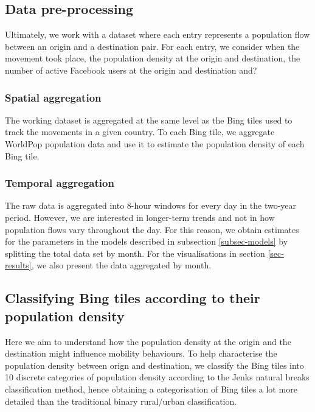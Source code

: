 \documentclass[11pt,letterpaper]{article}
\begin{document}
\subsection{Data pre-processing}

Ultimately, we work with a dataset where each entry represents a
population flow between an origin and a destination pair. For each
entry, we consider when the movement took place, the population density
at the origin and destination, the number of active Facebook users at
the origin and destination and?

\subsubsection{Spatial aggregation}

The working dataset is aggregated at the same level as the Bing tiles
used to track the movements in a given country. To each Bing tile, we
aggregate WorldPop population data and use it to estimate the population
density of each Bing tile.

\subsubsection{Temporal aggregation}

The raw data is aggregated into 8-hour windows for every day in the
two-year period. However, we are interested in longer-term trends and
not in how population flows vary throughout the day. For this reason, we
obtain estimates for the parameters in the models described in
subsection \ref{subsec-models} by splitting the total data set by month.
For the visualisations in section \ref{sec-results}, we also present the
data aggregated by month.

\subsection{Classifying Bing tiles according to their population density}

Here we aim to understand how the population density at the origin and
the destination might influence mobility behaviours. To help
characterise the population density between orign and destination, we
classify the Bing tiles into 10 discrete categories of population
density according to the Jenks natural breaks classification method,
hence obtaining a categorisation of Bing tiles a lot more detailed than
the traditional binary rural/urban classification.
\end{document}
